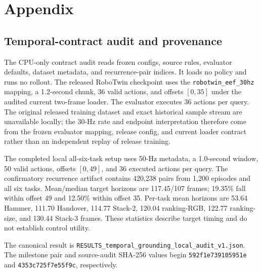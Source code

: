 \section{Appendix}\label{sec:appendix}

\subsection{Temporal-contract audit and provenance}
The CPU-only contract audit reads frozen configs, source rules, evaluator
defaults, dataset metadata, and recurrence-pair indices.  It loads no policy and
runs no rollout.  The released RoboTwin checkpoint uses the
\texttt{robotwin\_eef\_30hz} mapping, a 1.2-second chunk, 36 valid actions, and
offsets $[0,35]$ under the audited current two-frame loader.  The evaluator
executes 36 actions per query.  The original released training dataset and
exact historical sample stream are unavailable locally; the 30-Hz rate and
endpoint interpretation therefore come from the frozen evaluator mapping,
release config, and current loader contract rather than an independent replay
of release training.

The completed local all-six-task setup uses 50-Hz metadata, a 1.0-second
window, 50 valid actions, offsets $[0,49]$, and 36 executed actions per query.
The confirmatory recurrence artifact contains 420,238 pairs from 1,200 episodes
and all six tasks.  Mean/median target horizons are 117.45/107 frames; 19.35\%
fall within offset 49 and 12.50\% within offset 35.  Per-task mean horizons are
53.64 Hammer, 111.70 Handover, 114.77 Stack-2, 120.04 ranking-RGB, 122.77
ranking-size, and 130.44 Stack-3 frames.  These statistics describe target
timing and do not establish control utility.

The canonical result is
\texttt{RESULTS\_temporal\_grounding\_local\_audit\_v1.json}.  The milestone
pair and source-audit SHA-256 values begin
\texttt{592f1e739105951e} and \texttt{4353c725f7e55f9c}, respectively.

